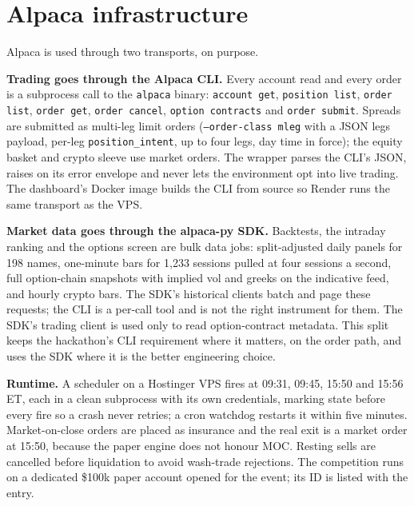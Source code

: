 \documentclass[10pt,a4paper,twocolumn]{article}
\begin{document}
\section{Alpaca infrastructure}

Alpaca is used through two transports, on purpose.

\textbf{Trading goes through the Alpaca CLI.} Every account read and every order is a subprocess call to the
\texttt{alpaca} binary: \texttt{account get}, \texttt{position list}, \texttt{order list}, \texttt{order get},
\texttt{order cancel}, \texttt{option contracts} and \texttt{order submit}. Spreads are submitted as multi-leg limit
orders (\texttt{--order-class mleg} with a JSON legs payload, per-leg \texttt{position\_intent}, up to four legs, day
time in force); the equity basket and crypto sleeve use market orders. The wrapper parses the CLI's JSON, raises on its
error envelope and never lets the environment opt into live trading. The dashboard's Docker image builds the CLI from source so Render runs the same transport as the VPS.

\textbf{Market data goes through the alpaca-py SDK.} Backtests, the intraday ranking and the options screen are bulk
data jobs: split-adjusted daily panels for 198 names, one-minute bars for 1,233 sessions pulled at four sessions a
second, full option-chain snapshots with implied vol and greeks on the indicative feed, and hourly crypto bars. The
SDK's historical clients batch and page these requests; the CLI is a per-call tool and is not the right instrument for
them. The SDK's trading client is used only to read option-contract metadata. This split keeps the hackathon's
CLI requirement where it matters, on the order path, and uses the SDK where it is the better engineering choice.

\textbf{Runtime.} A scheduler on a Hostinger VPS fires at 09:31, 09:45, 15:50 and 15:56 ET, each in a clean subprocess
with its own credentials, marking state before every fire so a crash never retries; a cron watchdog restarts it within
five minutes. Market-on-close orders are placed as insurance and the real exit is a market
order at 15:50, because the paper engine does not honour MOC. Resting sells are cancelled before liquidation to avoid
wash-trade rejections. The competition runs on a dedicated \$100k paper account opened for the event; its ID is listed
with the entry.
\end{document}
